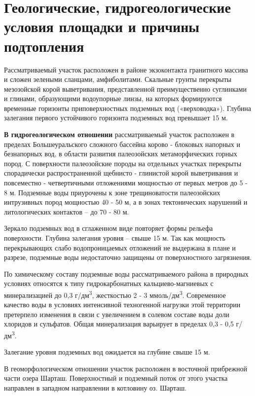 \documentclass[a4paper,12pt]{article} %
\begin{document}
\section{Геологические, гидрогеологические условия площадки и причины подтопления}

Рассматриваемый участок расположен в районе экзоконтакта гранитного массива и сложен зелеными сланцами, амфиболитами. Скальные грунты перекрыты мезозойской корой выветривания, представленной преимущественно суглинками и глинами, образующими водоупорные линзы, на которых формируются временные горизонты приповерхностных подземных вод («верховодка»). Глубина залегания первого устойчивого горизонта подземных вод превышает 15 м.

\textbf{В гидрогеологическом отношении} рассматриваемый участок расположен в пределах Большеуральского сложного бассейна корово - блоковых напорных и безнапорных вод, в области развития палеозойских метаморфических горных пород. С поверхности палеозойские породы на отдельных участках перекрыты спорадически распространенной щебнисто - глинистой корой выветривания и повсеместно - четвертичными отложениями мощностью от первых метров до 5 - 8 м. Подземные воды приурочены к зоне трещиноватости палеозойских интрузивных пород мощностью 40 - 50 м, а в зонах тектонических нарушений и литологических контактов -- до 70 - 80 м. 

Зеркало подземных вод в сглаженном виде повторяет формы рельефа поверхности. Глубина залегания уровня – свыше 15 м. Так как мощность перекрывающих слабо водопроницаемых отложений не выдержана в плане и разрезе, подземные воды недостаточно защищены от поверхностного загрязнения.

По химическому составу подземные воды рассматриваемого района в природных условиях относятся к типу гидрокарбонатных кальциево-магниевых с минерализацией до 0,3 г/дм\textsuperscript{3}, жесткостью 2 - 3 ммоль/дм\textsuperscript{3}. Современное качество воды в условиях интенсивной техногенной нагрузки этой территории претерпело изменения в связи с увеличением в солевом составе воды доли хлоридов и сульфатов. Общая минерализация варьирует в пределах 0,3 - 0,5 г/дм\textsuperscript{3}.

Залегание уровня подземных вод ожидается на глубине свыше 15 м.

В геоморфологическом отношении участок расположен в восточной прибрежной части озера Шарташ. Поверхностный и подземный поток от этого участка направлен в западном направлении в котловину оз. Шарташ.
\end{document}
